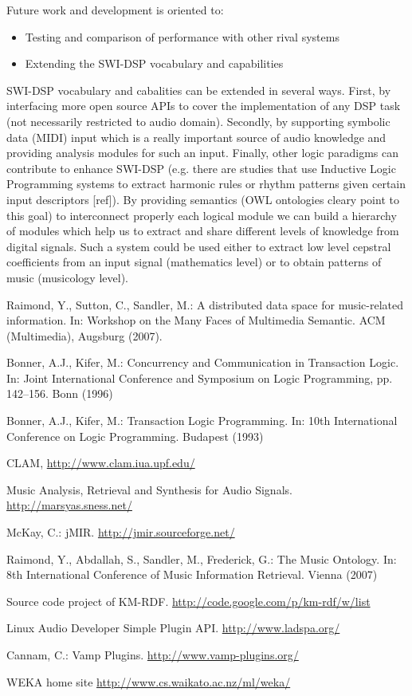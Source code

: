 \documentclass[runningheads]{llncs}
\begin{document}
Future work and development is oriented to:

\begin{itemize}
 \item Testing and comparison of performance with other rival systems
 \item Extending the SWI-DSP vocabulary and capabilities
\end{itemize}

SWI-DSP vocabulary and cabalities can be extended in several ways. First, by interfacing more open source APIs to cover the implementation of any DSP task (not necessarily restricted to audio domain). Secondly, by supporting symbolic data (MIDI) input which is a really important source of audio knowledge and providing analysis modules for such an input. Finally, other logic paradigms can contribute to enhance SWI-DSP (e.g. there are studies that use Inductive Logic Programming systems to extract harmonic rules or rhythm patterns given certain input descriptors [ref]). By providing semantics (OWL ontologies cleary point to this goal) to interconnect properly each logical module we can build a hierarchy of modules which help us to extract and share different levels of knowledge from digital signals. Such a system could be used either to extract low level cepstral coefficients from an input signal (mathematics level) or to obtain patterns of music (musicology level).

\begin{thebibliography}{4}

 Raimond, Y., Sutton, C., Sandler, M.: A distributed data space for music-related information. In: Workshop on the Many Faces of Multimedia Semantic. ACM (Multimedia), Augsburg (2007).

 Bonner, A.J., Kifer, M.: Concurrency and Communication in Transaction Logic. In: Joint International Conference and Symposium on Logic Programming, pp. 142--156. Bonn (1996)

 Bonner, A.J., Kifer, M.: Transaction Logic Programming. In: 10th International Conference on Logic Programming. Budapest (1993)

 CLAM, \url{http://www.clam.iua.upf.edu/}

 Music Analysis, Retrieval and Synthesis for Audio Signals. \url{http://marsyas.sness.net/}

 McKay, C.: jMIR. \url{http://jmir.sourceforge.net/}

 Raimond, Y., Abdallah, S., Sandler, M., Frederick, G.: The Music Ontology. In: 8th International Conference of Music Information Retrieval. Vienna (2007)

 Source code project of KM-RDF. \url{http://code.google.com/p/km-rdf/w/list}

 Linux Audio Developer Simple Plugin API. \url{http://www.ladspa.org/}

 Cannam, C.: Vamp Plugins. \url{http://www.vamp-plugins.org/}

 WEKA home site \url{http://www.cs.waikato.ac.nz/ml/weka/}

\end{thebibliography}
\end{document}
